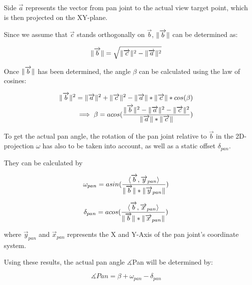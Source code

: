 \documentclass{article}
\DeclarePairedDelimiter\norm{\lVert}{\rVert}%
\begin{document}
Side $\overrightarrow{a}$ represents the vector from pan joint to the actual view target point, which is then projected on the XY-plane.

Since we assume that $\overrightarrow{c}$ stands orthogonally on $\overrightarrow{b}$, $\norm{\overrightarrow{b}}$ can be determined as:

\begin{equation}
\norm{\overrightarrow{b}} = \sqrt{\norm{\overrightarrow{c}}^{2}-\norm{\overrightarrow{a}}^2}
\end{equation}

Once $\norm{\overrightarrow{b}}$ has been determined, the angle $\beta$ can be calculated using the law of cosines:

\begin{equation}
\begin{aligned}
\norm{\overrightarrow{b}}^2 = \norm{\overrightarrow{a}}^2 + \norm{\overrightarrow{c}}^2 - \norm{\overrightarrow{a}}*\norm{\overrightarrow{c}}*cos(\beta) \\
\implies 
\beta = acos(\frac{\norm{\overrightarrow{b}}^2 - \norm{\overrightarrow{a}}^2 - \norm{\overrightarrow{c}}^2}{\norm{\overrightarrow{a}}*\norm{\overrightarrow{c}}})
\end{aligned}
\end{equation}

To get the actual pan angle, the rotation of the pan joint relative to $\overrightarrow{b}$ in the 2D-projection $\omega$ has also to be taken into account, as well as a static offset $\delta_{pan}$. 

They can be calculated by 

\begin{equation}
\omega_{pan}=asin(\frac{\langle\overrightarrow{b},\overrightarrow{y}_{pan}\rangle}{\norm{\overrightarrow{b}}*\norm{\overrightarrow{y}_{pan}}})
\end{equation}

\begin{equation}
\delta_{pan}=acos(\frac{\langle\overrightarrow{b},\overrightarrow{x}_{pan}\rangle}{\norm{\overrightarrow{b}}*\norm{\overrightarrow{x}_{pan}}})
\end{equation}

where $\overrightarrow{y}_{pan}$ and $\overrightarrow{x}_{pan}$ represents the X and Y-Axis of the pan joint's coordinate system.

Using these results, the actual pan angle $\measuredangle{}$Pan will be determined by:

\begin{equation}
 \measuredangle{}Pan=\beta+\omega_{pan}-\delta_{pan}
\end{equation}
\end{document}

